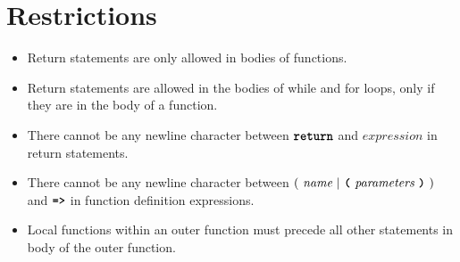 \section*{Restrictions}

\begin{itemize}
\item Return statements are only allowed in bodies of functions.
\item Return statements are allowed in the bodies of while and for loops, only if they are in the body of a function.
\item There cannot be any newline character between
$\textbf{\texttt{return}}$ and $\textit{expression}$ in return statements.
\item There cannot be any newline character between
  $(\ \textit{name}\ | \ \textbf{\texttt{(}}\ \textit{parameters}\ \textbf{\texttt{)}}\ )$
                                               and
$\texttt{\textbf{=>}}$ in function definition expressions.
\item Local functions within an outer function
  must precede all other statements in body of the outer function.
\end{itemize}
